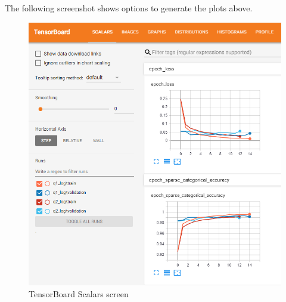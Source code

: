 \documentclass[11pt]{article}
\begin{document}
The following screenshot shows options to generate the plots above.

\begin{figure}[H]
\centering
\includegraphics[width=0.65\columnwidth]{pics/tb2.png}
\captionsetup{justification=centering}
\caption{TensorBoard Scalars screen}
\label{fig:data}
\end{figure}
\end{document}
